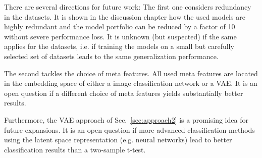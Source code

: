 \documentclass{article}
\begin{document}
There are several directions for future work: The first one considers redundancy in the datasets. It is shown in the discussion chapter how the used models are highly redundant and the model portfolio can be reduced by a factor of 10 without severe performance loss. It is unknown (but suspected) if the same applies for the datasets, i.e. if training the models on a small but carefully selected set of datasets leads to the same generalization performance. 

The second tackles the choice of meta features. All used meta features are located in the embedding space of either a image classification network or a VAE. It is an open question if a different choice of meta features yields substantially better results.

Furthermore, the VAE approach of Sec.~\ref{sec:approach2} is a promising idea for future expansions. It is an open question if more advanced classification methods using the latent space representation (e.g. neural networks) lead to better classification results than a two-sample t-test. 



\end{document}
